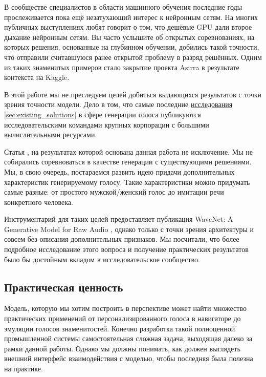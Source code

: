 \documentclass[../diploma.tex]{subfiles}
\begin{document}
В сообществе специалистов в области машинного обучения последние годы прослеживается пока ещё незатухающий интерес к нейронным сетям. 
На многих публичных выступлениях любят говорит о том, что дешёвые GPU дали второе дыхание нейронным сетям. 
Вы часто услышите об открытых соревнованиях, на которых решения, основанные на глубинном обучении, добились такой точности, что отправили считавшуюся ранее открытой проблему в разряд решённых.
Одним из таких знаменитых примеров стало закрытие проекта Asirra\cite{elson2007asirra} в результате контекста на Kaggle\cite{kaggle:dogcats}. 

В этой работе мы не преследуем целей добиться выдающихся результатов с точки зрения точности модели.
Дело в том, что самые последние \hyperref[sec:existing_solutions]{исследования} \autoref{sec:existing_solutions} в сфере генерации голоса публикуются исследовательскими командами крупных корпорации с большими вычислительными ресурсами. 

Статья \cite{article:van2016wavenet}, на результатах которой основана данная работа не исключение.
Мы не собирались соревноваться в качестве генерации с существующими решениями. Мы, в свою очередь, постараемся развить идею придачи дополнительных характеристик генерируемому голосу. Такие характеристики можно придумать самые разные: от простого мужской/женский голос до имитации речи конкретного человека.


Инструментарий для таких целей предоставляет публикация WaveNet: A Generative Model for Raw Audio \cite{article:van2016wavenet}, однако только с точки зрения архитектуры и совсем без описания дополнительных признаков. Мы посчитали, что более подробное исследование этого вопроса и получение практических результатов было бы достойным вкладом в исследовательское сообщество.

\subsection*{Практическая ценность}

Модель, которую мы хотим построить в перспективе может найти множество практических применений от персонализированного голоса в навигаторе до эмуляции голосов знаменитостей. Конечно разработка такой полноценной промышленной системы самостоятельная сложная задача, выходящая далеко за рамки данной работы. Однако мы должны понимать, как должен выглядеть внешний интерфейс взаимодействия с моделью, чтобы последняя была полезна на практике. 
\end{document}
